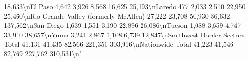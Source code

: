 \documentclass[
]{krantz}
\makeatletter
\newenvironment{Shaded}{\begin{snugshade}}{\end{snugshade}}
\newenvironment{kframe}{%
\medskip{}
\setlength{\fboxsep}{.8em}
 \def\at@end@of@kframe{}%
 \ifinner\ifhmode%
  \def\at@end@of@kframe{\end{minipage}}%
  \begin{minipage}{\columnwidth}%
 \fi\fi%
 \def\FrameCommand##1{\hskip\@totalleftmargin \hskip-\fboxsep
 \colorbox{shadecolor}{##1}\hskip-\fboxsep
     \hskip-\linewidth \hskip-\@totalleftmargin \hskip\columnwidth}%
 \MakeFramed {\advance\hsize-\width
   \@totalleftmargin\z@ \linewidth\hsize
   \@setminipage}}%
 {\par\unskip\endMakeFramed%
 \at@end@of@kframe}
\renewenvironment{Shaded}{\begin{kframe}}{\end{kframe}}
\makeatother
\begin{document}
\begin{Shaded}
\begin{Highlighting}[]
          18,633\textbackslash{}nEl Paso                                         4,642                     3,926                8,568           16,625             25,193\textbackslash{}nLaredo                                           477                      2,033                2,510           22,950             25,460\textbackslash{}nRio Grande Valley (formerly McAllen)           27,222                    23,708                50,930          86,632            137,562\textbackslash{}nSan Diego                                       1,639                     1,551                3,190           22,896             26,086\textbackslash{}nTucson                                          1,088                     3,659                4,747           33,910             38,657\textbackslash{}nYuma                                            3,241                     2,867                6,108            6,739             12,847\textbackslash{}nSouthwest Border Sectors Total                 41,131                    41,435                82,566         221,350            303,916\textbackslash{}nNationwide Total                               41,223                    41,546                82,769         227,762            310,531\textbackslash{}n"                                                                                                                                                                                                                                                                                                                                                                                                                                                                                                                                                                                                                                                                                                                                                                                                                                                                                                                                                                                                                                                                                                                                                                                                                                                                                                                                                                                                                                                                                                                                                                                                                                                                                                                                                                                                                                                                                                                                                                                                                                                                                                                        
\end{Highlighting}
\end{Shaded}
\end{document}
